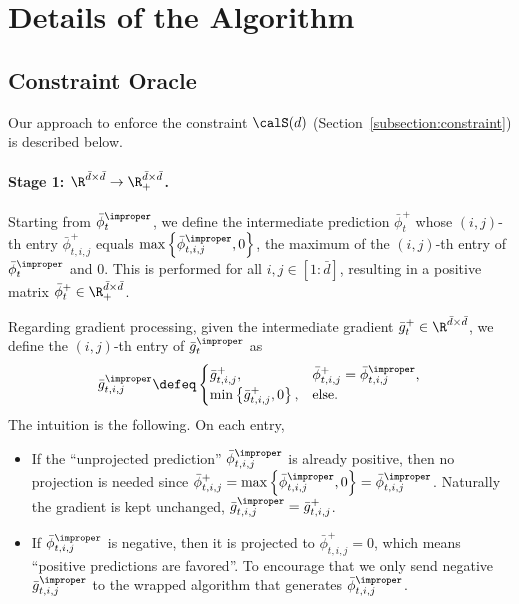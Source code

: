 \documentclass[10pt]{article}
\begin{document}
\section{Details of the Algorithm}\label{section:code}

\subsection{Constraint Oracle}\label{subsection:detail_constraint}

Our approach to enforce the constraint $\calS(d)$ (Section~\ref{subsection:constraint}) is described below. 

\paragraph{Stage 1: $\R^{\bar d\times\bar d}\rightarrow \R_+^{\bar d\times\bar d}$.} Starting from $\bar \phi^\improper_t$, we define the intermediate prediction $\bar \phi^+_t$ whose $(i,j)$-th entry $\bar \phi^+_{t,i,j}$ equals $\max\left\{\bar \phi^\improper_{t,i,j}, 0\right\}$, the maximum of the $(i,j)$-th entry of $\bar \phi^\improper_t$ and $0$. This is performed for all $i,j\in[1:\bar d]$, resulting in a positive matrix $\bar \phi^+_t\in\R^{\bar d\times\bar d}_+$. 

Regarding gradient processing, given the intermediate gradient $\bar g_t^+\in\R^{\bar d\times\bar d}$, we define the $(i,j)$-th entry of $\bar g^\improper_t$ as
\begin{equation*}
\bar g^\improper_{t,i,j}\defeq\begin{cases}
\bar g^+_{t,i,j},& \bar \phi^+_{t,i,j}=\bar \phi^\improper_{t,i,j},\\
\min\left\{\bar g^+_{t,i,j},0\right\},& \mathrm{else}.
\end{cases}
\end{equation*}
The intuition is the following. On each entry,
\begin{itemize}
\item If the ``unprojected prediction'' $\bar \phi^\improper_{t,i,j}$ is already positive, then no projection is needed since $\bar \phi^+_{t,i,j}=\max\left\{\bar \phi^\improper_{t,i,j}, 0\right\}=\bar \phi^\improper_{t,i,j}$. Naturally the gradient is kept unchanged, $\bar g^\improper_{t,i,j}=\bar g^+_{t,i,j}$. 
\item If $\bar \phi^\improper_{t,i,j}$ is negative, then it is projected to $\bar \phi^+_{t,i,j}=0$, which means ``positive predictions are favored''. To encourage that we only send negative $\bar g^\improper_{t,i,j}$ to the wrapped algorithm that generates $\bar \phi^\improper_{t,i,j}$. 
\end{itemize}
\end{document}
